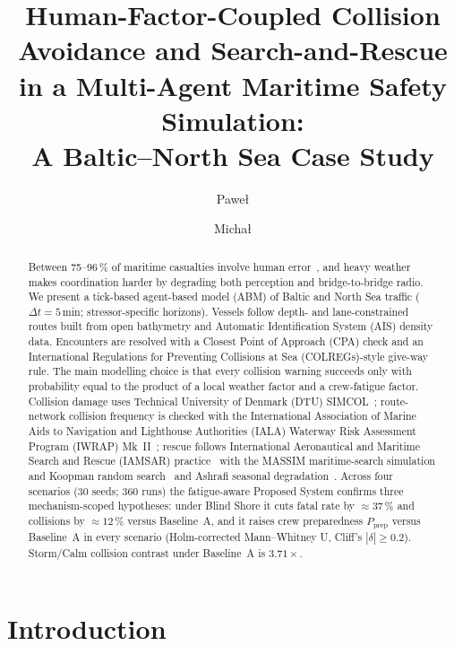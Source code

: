 \documentclass[cameraready]{Interspeech}
\title{Human-Factor-Coupled Collision Avoidance and Search-and-Rescue\\
       in a Multi-Agent Maritime Safety Simulation:\\
       A Baltic--North Sea Case Study}
\author[affiliation={1}]{Pawe\l}{Pozorski}
\author[affiliation={1}]{Micha\l}{Pytel}
\begin{document}
\maketitle

\begin{abstract}
Between 75--96\,\% of maritime casualties involve human error~\cite{rothblum2000}, and heavy weather makes coordination harder by degrading both perception and bridge-to-bridge radio. We present a tick-based agent-based model (ABM) of Baltic and North Sea traffic ($\Delta t=5$\,min; stressor-specific horizons). Vessels follow depth- and lane-constrained routes built from open bathymetry and Automatic Identification System (AIS) density data. Encounters are resolved with a Closest Point of Approach (CPA) check and an International Regulations for Preventing Collisions at Sea (COLREGs)-style give-way rule. The main modelling choice is that every collision warning succeeds only with probability equal to the product of a local weather factor and a crew-fatigue factor. Collision damage uses Technical University of Denmark (DTU) SIMCOL~\cite{lutzen2001}; route-network collision frequency is checked with the International Association of Marine Aids to Navigation and Lighthouse Authorities (IALA) Waterway Risk Assessment Program (IWRAP) Mk~II~\cite{friishansen2008iwrap}; rescue follows International Aeronautical and Maritime Search and Rescue (IAMSAR) practice~\cite{imosar2018} with the MASSIM maritime-search simulation and Koopman random search~\cite{karatas2018,koopman1980} and Ashrafi seasonal degradation~\cite{ashrafi2024}. Across four scenarios ($30$ seeds; $360$ runs) the fatigue-aware Proposed System confirms three mechanism-scoped hypotheses: under Blind Shore it cuts fatal rate by ${\approx}37\,\%$ and collisions by ${\approx}12\,\%$ versus Baseline~A, and it raises crew preparedness $P_{\mathrm{prep}}$ versus Baseline~A in every scenario (Holm-corrected Mann--Whitney U, Cliff's $|\delta|\ge0.2$). Storm/Calm collision contrast under Baseline~A is $3.71\times$.
\end{abstract}

\section{Introduction}
\label{sec:intro}
\end{document}

